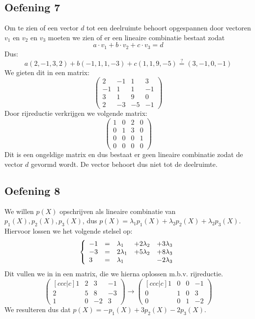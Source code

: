 \documentclass[lineaire_algebra_oplossingen.tex]{subfiles}
\begin{document}
\subsection{Oefening 7}
Om te zien of een vector $d$ tot een deelruimte behoort opgespannen door vectoren $v_1$ en $v_2$ en $v_3$ moeten we zien of er een lineaire combinatie bestaat zodat  $$a\cdot v_1 + b\cdot v_2 + c\cdot v_3 = d$$
Dus:
$$a(2,-1,3,2) + b(-1,1,1,-3) + c(1,1,9,-5) \overset{?}{=} (3,-1,0,-1)$$
We gieten dit in een matrix:
$$
\begin{pmatrix}
2 & -1 & 1 &3\\
-1 & 1 & 1 & -1\\
3 & 1 &9 & 0\\
2 & -3 &-5& -1
\end{pmatrix}
$$
Door rijreductie verkrijgen we volgende matrix:
$$
\begin{pmatrix}
1&0&2&0\\
0&1&3&0\\
0&0&0&1\\
0&0&0&0
\end{pmatrix}
$$
Dit is een ongeldige matrix en dus bestaat er geen lineaire combinatie zodat de vector $d$ gevormd wordt. De vector behoort dus niet tot de deelruimte.

\subsection{Oefening 8}
We willen $p(X)$ opschrijven als lineaire combinatie van $p_1(X), p_2(X), p_3(X)$, dus $p(X) = \lambda_1 p_1(X) + \lambda_2 p_2(X) + \lambda_2 p_3(X)$.
Hiervoor lossen we het volgende stelsel op:
\[
\left\{
\begin{array}{l l l l l}
  -1 &= &\lambda_1 &+ 2 \lambda_2 &+ 3 \lambda_3\\
  -3 &= &2 \lambda_1 &+ 5 \lambda_2 &+ 8 \lambda_3\\
  3 &= &\lambda_1 &&- 2 \lambda_3
\end{array}
\right.
\]
Dit vullen we in in een matrix, die we hierna oplossen m.b.v. rijreductie.
\[
\begin{pmatrix}[ccc|c]
  1 & 2 & 3 & -1\\
  2 & 5 & 8 & -3\\
  1 & 0 & -2 & 3
\end{pmatrix}
\rightarrow
\begin{pmatrix}[ccc|c]
  1 & 0 & 0 & -1\\
  0 & 1 & 0 & 3\\
  0 & 0 & 1 & -2
\end{pmatrix}
\]
We resulteren dus dat $p(X) = - p_1(X) + 3 p_2(X) - 2 p_3(X)$.
\end{document}
